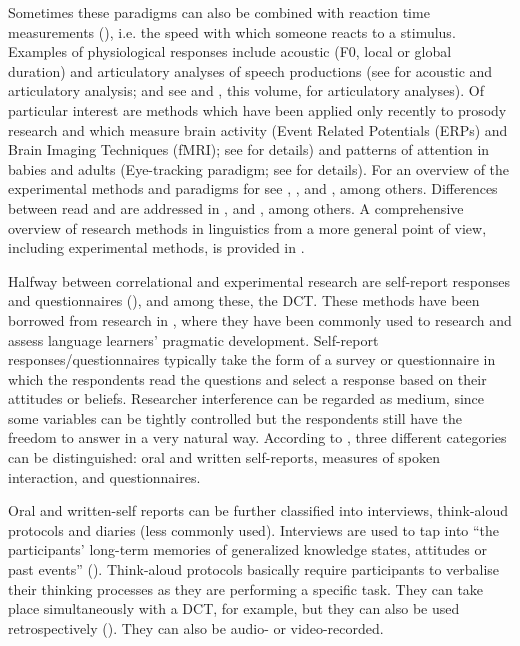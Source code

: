 \documentclass[output=paper]{LSP/langsci}
\begin{document}
Sometimes these paradigms can also be combined with reaction time measurements (\citealt{Chen2003,Feldhausen2011}), i.e. the speed with which someone reacts to a stimulus. Examples of physiological responses include acoustic (F0, local or global duration) and articulatory analyses of speech productions (see \citealt{Prieto1995,Arvaniti1998,Frota2002} for acoustic and articulatory analysis; and see \citealt{DImperio.2007,Muecke2006,Stella2014} and \citeauthor{GiliFivela.2018}, this volume, for articulatory analyses). Of particular interest are methods which have been applied only recently to prosody research and which measure brain activity (Event Related Potentials (ERPs) and Brain Imaging Techniques (fMRI); see \citealt{Kaiser2006} for details) and patterns of attention in babies and adults (Eye-tracking paradigm; see \citealt{Watson2006} for details). For an overview of the experimental methods and paradigms for  see \citet{Sudhoff.2006}, \citet{Prieto.2012}, and \citet{Niebuhr2015}, among others. Differences between read and  are addressed in \citet{Llisterri1992,Beckman1997,Face2003,Xu2010}, and \citet{Wagner.2015}, among others. A comprehensive overview of research methods in linguistics from a more general point of view, including experimental methods, is provided in \citet{Podesva.2013}.

Halfway between correlational and experimental research are self-report responses and questionnaires (), and among these, the DCT. These methods have been borrowed from research in , where they have been commonly used to research and assess language learners’ pragmatic development. Self-report responses/questionnaires typically take the form of a survey or questionnaire in which the respondents read the questions and select a response based on their attitudes or beliefs. Researcher interference can be regarded as medium, since some variables can be tightly controlled but the respondents still have the freedom to answer in a very natural way. According to \citet{kasper2002}, three different categories can be distinguished: oral and written self-reports, measures of spoken interaction, and questionnaires. 

{Oral and written-self reports} can be further classified into interviews, think-aloud protocols and diaries (less commonly used). Interviews are used to tap into ``the participants’ long-term memories of generalized knowledge states, attitudes or past events” (\citealt[107]{kasper2002}). Think-aloud protocols basically require participants to verbalise their thinking processes as they are performing a specific task. They can take place simultaneously with a DCT, for example, but they can also be used retrospectively (\citealt{Cohen1993,Robinson1992}). They can also be audio- or video-recorded.  
\end{document}

